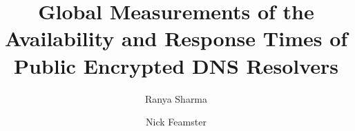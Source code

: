\documentclass[10pt,sigconf,letterpaper,nonacm]{acmart}
\title{Global Measurements of the Availability and Response Times of Public Encrypted DNS Resolvers}
\author{Ranya Sharma}
\affiliation{%
  \institution{University of Chicago}
  \country{}
}
\author{Nick Feamster}
\affiliation{%
  \institution{University of Chicago}
  \country{}
}
\begin{document}
\begin{sloppypar}



\maketitle





\label{lastpage}

\pagebreak



\pagebreak


\end{sloppypar}
\end{document}
